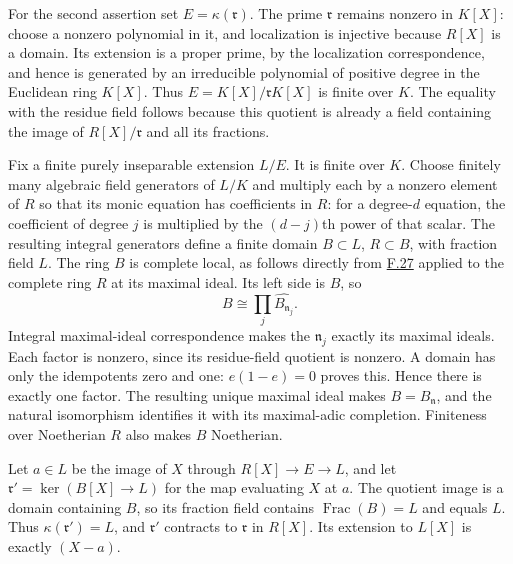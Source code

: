 \documentclass[11pt,a4paper,openany]{report}
\begin{document}
For the second assertion set \(E=\kappa(\mathfrak r)\). The prime \(\mathfrak r\) remains nonzero in \(K[X]\): choose a nonzero polynomial in it, and localization is injective because \(R[X]\) is a domain. Its extension is a proper prime, by the localization correspondence, and hence is generated by an irreducible polynomial of positive degree in the Euclidean ring \(K[X]\). Thus \(E=K[X]/\mathfrak rK[X]\) is finite over \(K\). The equality with the residue field follows because this quotient is already a field containing the image of \(R[X]/\mathfrak r\) and all its fractions.

Fix a finite purely inseparable extension \(L/E\). It is finite over \(K\). Choose finitely many algebraic field generators of \(L/K\) and multiply each by a nonzero element of \(R\) so that its monic equation has coefficients in \(R\): for a degree-\(d\) equation, the coefficient of degree \(j\) is multiplied by the \((d-j)\)th power of that scalar. The resulting integral generators define a finite domain \(B\subset L\), \(R\subset B\), with fraction field \(L\). The ring \(B\) is complete local, as follows directly from \hyperref[AG-RG-S05-algebra-lemma-completion-finite-extension]{F.27} applied to the complete ring \(R\) at its maximal ideal. Its left side is \(B\), so \[B\cong\prod_j\widehat{B_{\mathfrak n_j}}.\] Integral maximal-ideal correspondence makes the \(\mathfrak n_j\) exactly its maximal ideals. Each factor is nonzero, since its residue-field quotient is nonzero. A domain has only the idempotents zero and one: \(e(1-e)=0\) proves this. Hence there is exactly one factor. The resulting unique maximal ideal makes \(B=B_{\mathfrak n}\), and the natural isomorphism identifies it with its maximal-adic completion. Finiteness over Noetherian \(R\) also makes \(B\) Noetherian.

Let \(a\in L\) be the image of \(X\) through \(R[X]\to E\to L\), and let \(\mathfrak r'=\ker(B[X]\to L)\) for the map evaluating \(X\) at \(a\). The quotient image is a domain containing \(B\), so its fraction field contains \(\operatorname{Frac}(B)=L\) and equals \(L\). Thus \(\kappa(\mathfrak r')=L\), and \(\mathfrak r'\) contracts to \(\mathfrak r\) in \(R[X]\). Its extension to \(L[X]\) is exactly \((X-a)\).
\end{document}
